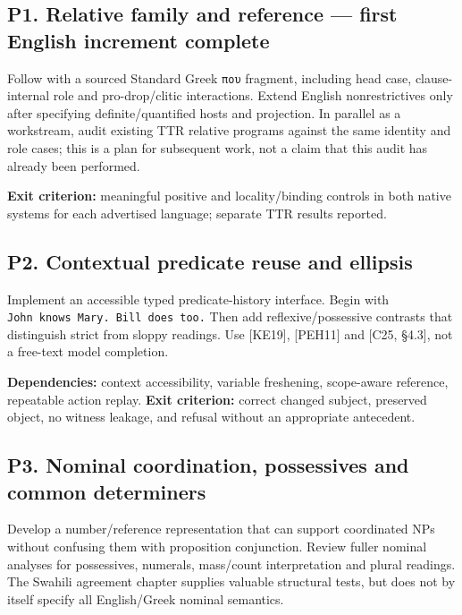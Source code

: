 \documentclass[11pt,a4paper]{article}
\begin{document}
\subsection{P1. Relative family and reference --- first English
increment
complete}\label{p1.-relative-family-and-reference-first-english-increment-complete}

Follow with a sourced Standard Greek \texttt{που} fragment, including
head case, clause-internal role and pro-drop/clitic interactions. Extend
English nonrestrictives only after specifying definite/quantified hosts
and projection. In parallel as a workstream, audit existing TTR relative
programs against the same identity and role cases; this is a plan for
subsequent work, not a claim that this audit has already been performed.

\textbf{Exit criterion:} meaningful positive and locality/binding
controls in both native systems for each advertised language; separate
TTR results reported.

\subsection{P2. Contextual predicate reuse and
ellipsis}\label{p2.-contextual-predicate-reuse-and-ellipsis}

Implement an accessible typed predicate-history interface. Begin with
\texttt{John\ knows\ Mary.\ Bill\ does\ too.} Then add
reflexive/possessive contrasts that distinguish strict from sloppy
readings. Use {[}KE19{]}, {[}PEH11{]} and {[}C25, §4.3{]}, not a
free-text model completion.

\textbf{Dependencies:} context accessibility, variable freshening,
scope-aware reference, repeatable action replay. \textbf{Exit
criterion:} correct changed subject, preserved object, no witness
leakage, and refusal without an appropriate antecedent.

\subsection{P3. Nominal coordination, possessives and common
determiners}\label{p3.-nominal-coordination-possessives-and-common-determiners}

Develop a number/reference representation that can support coordinated
NPs without confusing them with proposition conjunction. Review fuller
nominal analyses for possessives, numerals, mass/count interpretation
and plural readings. The Swahili agreement chapter supplies valuable
structural tests, but does not by itself specify all English/Greek
nominal semantics.
\end{document}
